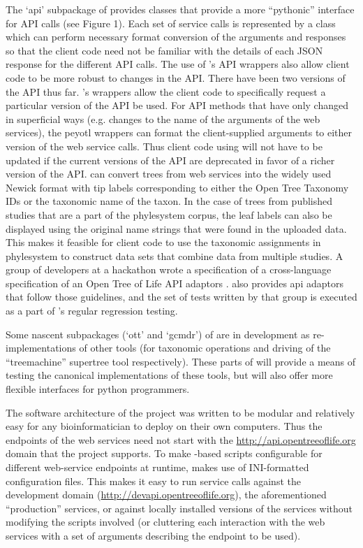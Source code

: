 \begin{methods}
The `api' subpackage of \pey provides classes that provide a more ``pythonic'' interface 
for \otol API calls (see Figure 1).
Each set of service calls is represented by a class which can perform necessary 
    format conversion of the arguments and responses so that the client code need 
    not be familiar with the details of each JSON response for the different API calls.
The use of \pey's API wrappers also allow client code to be more robust to changes in the API.
There have been two versions of the \otol API thus far.
\Pey's wrappers allow the client code to specifically request a particular version of the API be used.
For API methods that have only changed in superficial ways (e.g. changes to the name of 
the arguments of the web services), the peyotl wrappers can format the client-supplied arguments
to either version of the web service calls.
Thus client code using \pey will not have to be updated if the current versions of the
    API are deprecated in favor of a richer version of the \otol API.
\Pey can convert trees from \otol web services into the widely used Newick format with tip
    labels corresponding to either the Open Tree Taxonomy IDs or the taxonomic name of the taxon.
In the case of trees from published studies that are a part of the phylesystem corpus, the
    leaf labels can also be displayed using the original name strings that were found in
    the uploaded data.
This makes it feasible for client code to use the taxonomic assignments in phylesystem to 
    construct data sets that combine data from multiple studies.
A group of developers at a hackathon wrote a specification of a cross-language specification
of an Open Tree of Life API adaptors \citep{sharedapitests}.
\Pey also provides api adaptors that follow those guidelines, and the set of
    tests written by that group is executed as a part of \pey's regular regression testing.


Some nascent subpackages (`ott' and `gcmdr') of \pey are in development as re-implementations
    of other \otol tools (for taxonomic operations and driving of the ``treemachine'' supertree tool
    respectively).
These parts of \pey will provide a means of testing the canonical implementations of these
    tools, but will also offer more flexible interfaces for python programmers.

The software architecture of the \otol project was written to be modular and relatively 
    easy for any bioinformatician to deploy on their own computers.
Thus the endpoints of the \otol web services need not start with the \url{http://api.opentreeoflife.org} domain that the project supports.
To make \pey-based scripts configurable for different web-service endpoints at runtime, \pey
    makes use of INI-formatted configuration files.
This makes it easy to run service calls against the development domain (\url{http://devapi.opentreeoflife.org}), the aforementioned ``production'' services, or against locally installed
versions of the services without modifying the scripts involved (or cluttering each interaction with the web services with a set of arguments describing the endpoint to be used).

\end{methods}
